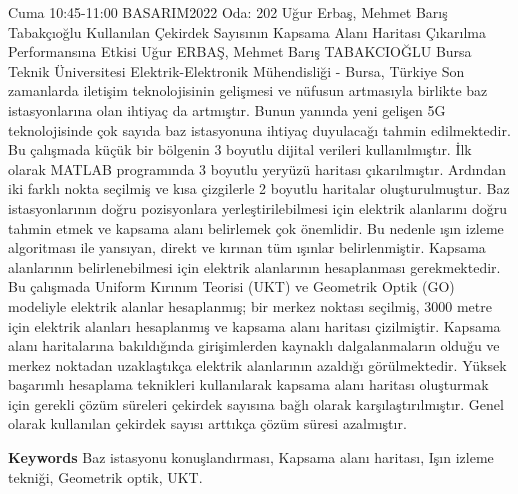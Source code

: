 
    \begin{abstract_basarim}
    {Cuma 10:45-11:00}
    {BASARIM2022}
    {Oda: 202}
    {Uğur Erbaş, Mehmet Barış Tabakçıoğlu}
    {Kullanılan Çekirdek Sayısının Kapsama Alanı Haritası Çıkarılma Performansına Etkisi}
    {%
    Uğur ERBAŞ, Mehmet Barış TABAKCIOĞLU}
    {%
    }
    {%
    Bursa Teknik Üniversitesi Elektrik-Elektronik Mühendisliği - Bursa, Türkiye}
    Son zamanlarda iletişim teknolojisinin gelişmesi ve nüfusun artmasıyla birlikte baz istasyonlarına olan ihtiyaç da artmıştır. Bunun yanında yeni gelişen 5G teknolojisinde çok sayıda baz istasyonuna ihtiyaç duyulacağı tahmin edilmektedir. Bu çalışmada küçük bir bölgenin 3 boyutlu dijital verileri kullanılmıştır. İlk olarak MATLAB programında 3 boyutlu yeryüzü haritası çıkarılmıştır. Ardından iki farklı nokta seçilmiş ve kısa çizgilerle 2 boyutlu haritalar oluşturulmuştur. Baz istasyonlarının doğru pozisyonlara yerleştirilebilmesi için elektrik alanlarını doğru tahmin etmek ve kapsama alanı belirlemek çok önemlidir. Bu nedenle ışın izleme algoritması ile yansıyan, direkt ve kırınan tüm ışınlar belirlenmiştir. Kapsama alanlarının belirlenebilmesi için elektrik alanlarının hesaplanması gerekmektedir. Bu çalışmada Uniform Kırınım Teorisi (UKT) ve Geometrik Optik (GO) modeliyle elektrik alanlar hesaplanmış; bir merkez noktası seçilmiş, 3000 metre için elektrik alanları hesaplanmış ve kapsama alanı haritası çizilmiştir. Kapsama alanı haritalarına bakıldığında girişimlerden kaynaklı dalgalanmaların olduğu ve merkez noktadan uzaklaştıkça elektrik alanlarının azaldığı görülmektedir. Yüksek başarımlı hesaplama teknikleri kullanılarak kapsama alanı haritası oluşturmak için gerekli çözüm süreleri çekirdek sayısına bağlı olarak karşılaştırılmıştır. Genel olarak kullanılan çekirdek sayısı arttıkça çözüm süresi azalmıştır. 
    
        \textbf{Keywords} \newline{}Baz istasyonu konuşlandırması, Kapsama alanı haritası, Işın izleme tekniği, Geometrik optik, UKT.
    \end{abstract_basarim}
    